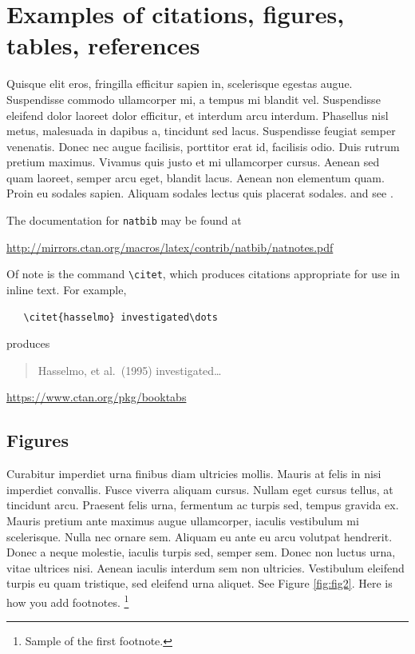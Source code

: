 \documentclass{article}
\begin{document}
\section{Examples of citations, figures, tables, references}
\label{sec:others}
Quisque elit eros, fringilla efficitur sapien in, scelerisque egestas augue. Suspendisse commodo ullamcorper mi, a tempus mi blandit vel. Suspendisse eleifend dolor laoreet dolor efficitur, et interdum arcu interdum. Phasellus nisl metus, malesuada in dapibus a, tincidunt sed lacus. Suspendisse feugiat semper venenatis. Donec nec augue facilisis, porttitor erat id, facilisis odio. Duis rutrum pretium maximus. Vivamus quis justo et mi ullamcorper cursus. Aenean sed quam laoreet, semper arcu eget, blandit lacus. Aenean non elementum quam. Proin eu sodales sapien. Aliquam sodales lectus quis placerat sodales. \cite{kour2014real,kour2014fast} and see \cite{hadash2018estimate}.

The documentation for \verb+natbib+ may be found at
\begin{center}
  \url{http://mirrors.ctan.org/macros/latex/contrib/natbib/natnotes.pdf}
\end{center}
Of note is the command \verb+\citet+, which produces citations
appropriate for use in inline text.  For example,
\begin{verbatim}
   \citet{hasselmo} investigated\dots
\end{verbatim}
produces
\begin{quote}
  Hasselmo, et al.\ (1995) investigated\dots
\end{quote}

\begin{center}
  \url{https://www.ctan.org/pkg/booktabs}
\end{center}


\subsection{Figures}
Curabitur imperdiet urna finibus diam ultricies mollis. Mauris at felis in nisi imperdiet convallis. Fusce viverra aliquam cursus. Nullam eget cursus tellus, at tincidunt arcu. Praesent felis urna, fermentum ac turpis sed, tempus gravida ex. Mauris pretium ante maximus augue ullamcorper, iaculis vestibulum mi scelerisque. Nulla nec ornare sem. Aliquam eu ante eu arcu volutpat hendrerit. Donec a neque molestie, iaculis turpis sed, semper sem. Donec non luctus urna, vitae ultrices nisi. Aenean iaculis interdum sem non ultricies. Vestibulum eleifend turpis eu quam tristique, sed eleifend urna aliquet. 
See Figure \ref{fig:fig2}. Here is how you add footnotes. \footnote{Sample of the first footnote.}
\end{document}
